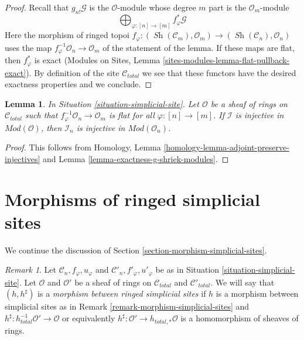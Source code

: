 \documentclass{stacks-project}
\theoremstyle{plain}
\newtheorem{lemma}[subsection]{Lemma}
\theoremstyle{definition}
\theoremstyle{remark}
\newtheorem{remark}[subsection]{Remark}
\numberwithin{equation}{subsection}
\def\Sh{\mathop{\mathit{Sh}}\nolimits}
\begin{document}
\begin{proof}
Recall that $g_{n!}\mathcal{G}$ is the $\mathcal{O}$-module
whose degree $m$ part is the $\mathcal{O}_m$-module
$$
\bigoplus\nolimits_{\varphi : [n] \to [m]} f_\varphi^*\mathcal{G}
$$
Here the morphism of ringed topoi
$f_\varphi : (\Sh(\mathcal{C}_m), \mathcal{O}_m) \to
(\Sh(\mathcal{C}_n), \mathcal{O}_n)$ uses the map
$f_\varphi^{-1}\mathcal{O}_n \to \mathcal{O}_m$ of the
statement of the lemma. If these maps are flat, then
$f_\varphi^*$ is exact
(Modules on Sites, Lemma \ref{sites-modules-lemma-flat-pullback-exact}).
By definition of the site $\mathcal{C}_{total}$ we see that these
functors have the desired exactness properties and we conclude.
\end{proof}

\begin{lemma}
\label{lemma-restriction-injective-to-component-site-module}
In Situation \ref{situation-simplicial-site}.
Let $\mathcal{O}$ be a sheaf of rings on $\mathcal{C}_{total}$
such that $f_\varphi^{-1}\mathcal{O}_n \to \mathcal{O}_m$
is flat for all $\varphi : [n] \to [m]$.
If $\mathcal{I}$ is injective in $\textit{Mod}(\mathcal{O})$, then
$\mathcal{I}_n$ is injective in $\textit{Mod}(\mathcal{O}_n)$.
\end{lemma}

\begin{proof}
This follows from
Homology, Lemma \ref{homology-lemma-adjoint-preserve-injectives}
and
Lemma \ref{lemma-exactness-g-shriek-modules}.
\end{proof}







\section{Morphisms of ringed simplicial sites}
\label{section-morphism-simplicial-sites-modules}

\noindent
We continue the discussion of Section \ref{section-morphism-simplicial-sites}.

\begin{remark}
\label{remark-morphism-simplicial-sites-modules}
Let $\mathcal{C}_n, f_\varphi, u_\varphi$ and
$\mathcal{C}'_n, f'_\varphi, u'_\varphi$ be as in
Situation \ref{situation-simplicial-site}.
Let $\mathcal{O}$ and $\mathcal{O}'$
be a sheaf of rings on $\mathcal{C}_{total}$ and $\mathcal{C}'_{total}$.
We will say that $(h, h^\sharp)$ is a
{\it morphism between ringed simplicial sites}
if $h$ is a morphism between simplicial sites as in
Remark \ref{remark-morphism-simplicial-sites}
and $h^\sharp : h_{total}^{-1}\mathcal{O}' \to \mathcal{O}$
or equivalently $h^\sharp : \mathcal{O}' \to h_{total, *}\mathcal{O}$
is a homomorphism of sheaves of rings.
\end{remark}
\end{document}
